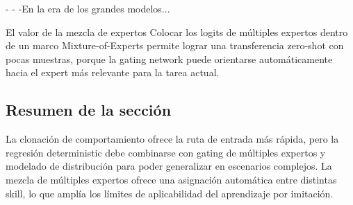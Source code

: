 -
-
-En la era de los grandes modelos...

\begin{knowledgebox}{El valor de la mezcla de expertos}
Colocar los logits de múltiples expertos dentro de un marco Mixture-of-Experts permite lograr una transferencia zero-shot con pocas muestras, porque la gating network puede orientarse automáticamente hacia el expert más relevante para la tarea actual.
\end{knowledgebox}

\subsection{Resumen de la sección}

La clonación de comportamiento ofrece la ruta de entrada más rápida, pero la regresión deterministic debe combinarse con gating de múltiples expertos y modelado de distribución para poder generalizar en escenarios complejos. La mezcla de múltiples expertos ofrece una asignación automática entre distintas skill, lo que amplía los límites de aplicabilidad del aprendizaje por imitación.

